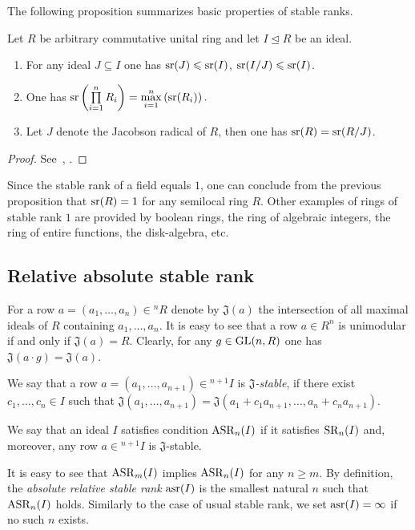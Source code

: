 The following proposition summarizes basic properties of stable ranks.
\begin{prop} \label{prop:sr_properties}
Let $R$ be arbitrary commutative unital ring and let $I\trianglelefteq R$ be an ideal.
\begin{enumerate}
\item For any ideal $J\subseteq I$ one has $\operatorname{sr}(J)\leqslant\operatorname{sr}(I)$, $\operatorname{sr}(I/J)\leqslant\operatorname{sr}(I)$.
\item One has $\operatorname{sr}\left(\prod\limits_{i=1}^n R_i\right)=\max\limits_{i=1}^n\left(\operatorname{sr}(R_i)\right).$
\item Let $J$ denote the Jacobson radical of $R$, then one has $\operatorname{sr}(R)=\operatorname{sr}(R/J)$.
\end{enumerate}
\end{prop}
\begin{proof} See~\cite[Theorem~2.3]{Va69}, \cite{Va71}. 
\end{proof}
\begin{example}
Since the stable rank of a field equals $1$, one can conclude from the previous proposition that $\operatorname{sr}(R)=1$ for any semilocal ring $R$.
Other examples of rings of stable rank $1$ are provided by boolean rings, the ring of algebraic integers, the ring of entire functions, the disk-algebra, etc.
\end{example}

\subsection{Relative absolute stable rank}\label{sec:rel-asr}
For a row $a=(a_1,\ldots,a_n)\in{}^n\!R$ denote by $\mathfrak{J}(a)$ the intersection of all maximal ideals of $R$ containing $a_1,\ldots,a_n$.
It is easy to see that a row $a\in R^n$ is unimodular if and only if $\mathfrak{J}(a)=R$. 
Clearly, for any $g\in\operatorname{GL}(n,R)$ one has $\mathfrak{J}(a\cdot g)=\mathfrak{J}(a)$.
\begin{dfn}\label{dfn:j-stable}
We say that a row $a=(a_1,\ldots,a_{n+1})\in{}^{n+1}\!I$ is {\it $\mathfrak{J}$-stable}, if there exist $c_1,\ldots,c_n\in I$ such that
$\mathfrak{J}(a_1,\ldots,a_{n+1})=\mathfrak{J}(a_1+c_1a_{n+1},\ldots,a_n+c_na_{n+1}).$
\end{dfn}
\begin{dfn}\label{dfn:asr}
We say that an ideal $I$ satisfies condition $\operatorname{ASR}_n(I)$ if it satisfies $\operatorname{SR}_n(I)$ and, moreover, any row $a\in{}^{n+1}\!I$ is $\mathfrak{J}$-stable.
\end{dfn}

It is easy to see that $\operatorname{ASR}_m(I)$ implies $\operatorname{ASR}_n(I)$ for any $n\geqslant m$. 
By definition, the \emph{absolute relative stable rank} $\operatorname{asr}(I)$ is the smallest natural $n$ such that $\operatorname{ASR}_n(I)$ holds. 
Similarly to the case of usual stable rank, we set $\operatorname{asr}(I)=\infty$ if no such $n$ exists.

